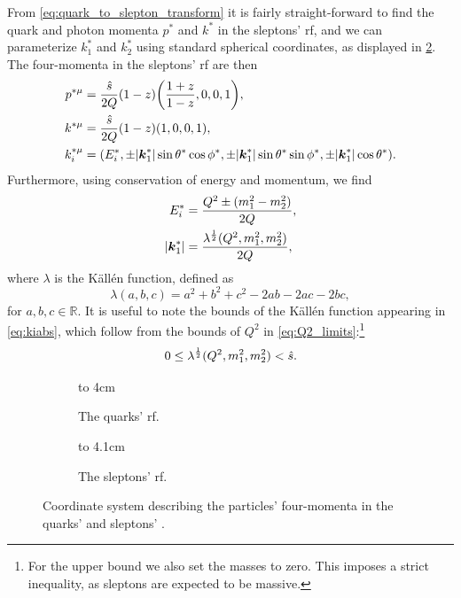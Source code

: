 From \cref{eq:quark_to_slepton_transform} it is fairly straight-forward to find the quark and photon momenta $p^*$ and $k^*$ in the sleptons' \gls{rf}, and we can parameterize  $k_1^*$ and $k_2^*$ using standard spherical coordinates, as displayed in \cref{fig:slepton_rf}. The four-momenta in the sleptons' \gls{rf} are then
\begin{subequations}
\label{eq:momenta_slepton_rf}
\begin{align}
    p^{*\mu} &= \frac{\hat{s}}{2Q}(1-z) \biggl(\frac{1+z}{1-z}, 0, 0, 1\biggr),
    \label{eq:p_slepton_rf}
    \\
    k^{*\mu} &= \frac{\hat{s}}{2Q}(1-z) (1, 0, 0, 1),
    \label{eq:k_slepton_rf}
    \\
    k_i^{*\mu} &= (E_i^*, \pm\lvert\boldsymbol{k}_1^*\rvert\sin\theta^*\cos\phi^*, \pm\lvert\boldsymbol{k}_1^*\rvert\sin\theta^*\sin\phi^*, \pm\lvert\boldsymbol{k}_1^*\rvert\cos\theta^*).
    \label{eq:ki_slepton_rf}
\end{align}
\end{subequations}
Furthermore, using conservation of energy and momentum, we find
\begin{subequations}
\begin{align}
    E_i^* &= \frac{Q^2 \pm (m_1^2-m_2^2)}{2Q},
    \label{eq:Ei}
    \\
    \lvert\boldsymbol{k}_1^*\rvert &= \frac{\lambda^{\frac{1}{2}}(Q^2, m_1^2, m_2^2)}{2Q},
    \label{eq:kiabs}
\end{align}
\end{subequations}
where $\lambda$ is the K\"all\'en function, defined as
\begin{equation}
    \lambda(a,b,c) = a^2 + b^2 + c^2 - 2ab - 2ac - 2bc,
    \label{eq:kallen}
\end{equation}
for $a,b,c\in\mathbb{R}$. It is useful to note the bounds of the K\"all\'en function appearing in \cref{eq:kiabs}, which follow from the bounds of $Q^2$ in \cref{eq:Q2_limits}:\footnote{For the upper bound we also set the masses to zero. This imposes a strict inequality, as sleptons are expected to be massive.}
\begin{equation}
    0 \leq \lambda^{\frac{1}{2}}(Q^2, m_1^2, m_2^2) < \hat{s}.
\end{equation}

\begin{figure}
    \centering
    \begin{subfigure}[b]{0.4\linewidth}
        \centering
        \vbox to 4cm {\vfil {} \vfil}
        \caption{The quarks' \acrshort{rf}.}
        \label{fig:quark_rf}    
    \end{subfigure}
    \begin{subfigure}[b]{0.4\linewidth}
        \centering
        \vbox to 4.1cm {\vfil {} \vfil}
        \caption{The sleptons' \acrshort{rf}.}
        \label{fig:slepton_rf}    
    \end{subfigure}
    \caption{Coordinate system describing the particles' four-momenta in the quarks' and sleptons' .}
    \label{fig:rfs}
\end{figure}


